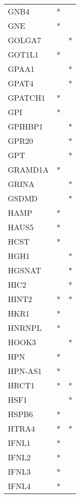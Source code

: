 \begin{longtable}{lcc}
GNB4         &         * &         \\
GNE          &         * &         \\
GOLGA7       &           &       * \\
GOT1L1       &         * &         \\
GPAA1        &           &       * \\
GPAT4        &           &       * \\
GPATCH1      &         * &         \\
GPI          &         * &         \\
GPIHBP1      &           &       * \\
GPR20        &           &       * \\
GPT          &           &       * \\
GRAMD1A      &         * &         \\
GRINA        &           &       * \\
GSDMD        &           &       * \\
HAMP         &         * &         \\
HAUS5        &         * &         \\
HCST         &         * &         \\
HGH1         &           &       * \\
HGSNAT       &           &       * \\
HIC2         &           &       * \\
HINT2        &         * &       * \\
HKR1         &         * &         \\
HNRNPL       &         * &         \\
HOOK3        &           &       * \\
HPN          &         * &         \\
HPN-AS1      &         * &         \\
HRCT1        &         * &       * \\
HSF1         &           &       * \\
HSPB6        &         * &         \\
HTRA4        &         * &       * \\
IFNL1        &         * &         \\
IFNL2        &         * &         \\
IFNL3        &         * &         \\
IFNL4        &         * &         \\

\end{longtable}
